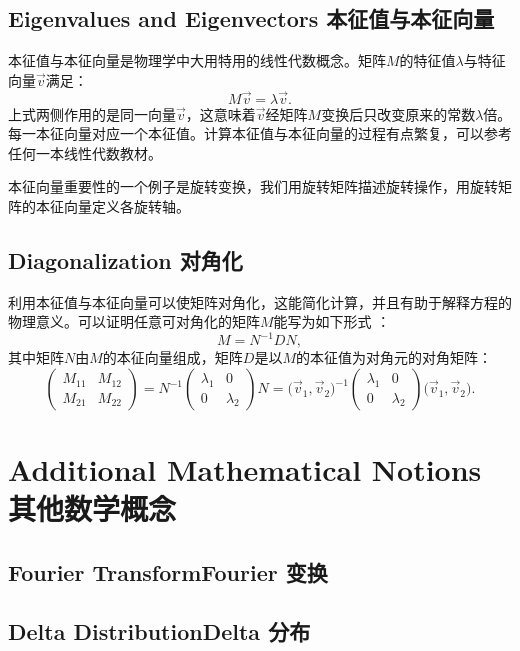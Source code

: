 \section[本征值与本征向量]{Eigenvalues and Eigenvectors 本征值与本征向量}
\label{sec.C.4}
本征值与本征向量是物理学中大用特用的线性代数概念。矩阵$M$的特征值$\lambda$与特征向量$\vec{v}$满足：
\begin{equation}
\label{equC.8}
	M \vec{v} = \lambda \vec{v}.
\end{equation}
上式两侧作用的是同一向量$\vec{v}$，这意味着$\vec{v}$经矩阵$M$变换后只改变原来的常数$\lambda$倍。每一本征向量对应一个本征值。计算本征值与本征向量的过程有点繁复，可以参考任何一本线性代数教材。

本征向量重要性的一个例子是旋转变换，我们用旋转矩阵描述旋转操作，用旋转矩阵的本征向量定义各旋转轴。


\section[对角化]{Diagonalization 对角化}
\label{sec.C.5}
利用本征值与本征向量可以使矩阵对角化，这能简化计算，并且有助于解释方程的物理意义。可以证明任意可对角化的矩阵$M$能写为如下形式%
%
：
\begin{equation}
\label{equC.9}
	M = N^{-1} D N,
\end{equation}
其中矩阵$N$由$M$的本征向量组成，矩阵$D$是以$M$的本征值为对角元的对角矩阵：
\begin{equation}
\label{equC.10}
	\begin{pmatrix}
		M_{11} & M_{12} \\
		M_{21} & M_{22}
	\end{pmatrix}
	= N^{-1}
		\begin{pmatrix}
			\lambda_1 & 0 \\
			0 & \lambda_2
		\end{pmatrix}
	N = \Big( \vec{v}_1, \vec{v}_2 \Big)^{-1}
		\begin{pmatrix}
			\lambda_1 & 0 \\
			0 & \lambda_2
		\end{pmatrix}
	\Big( \vec{v}_1, \vec{v}_2 \Big).
\end{equation}

\chapter[其他数学概念]{Additional Mathematical
Notions 其他数学概念}
\section[Fourier 变换]{Fourier Transform\quad Fourier 变换}
\section[Delta 分布]{Delta Distribution\quad Delta 分布}
